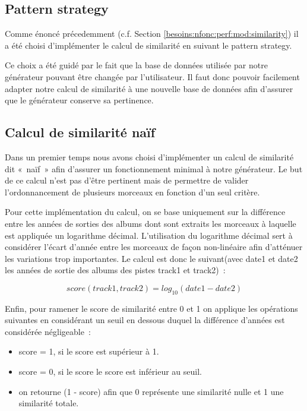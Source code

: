 \subsection{Pattern strategy}
\label{impl:similatite:strategy}

Comme énoncé précedemment (c.f. Section \ref{besoins:nfonc:perf:mod:similarity}) il a été choisi d'implémenter le calcul de similarité en suivant le pattern strategy.\newline

Ce choix a été guidé par le fait que la base de données utilisée par notre générateur pouvant être changée par l'utilisateur. Il faut donc pouvoir facilement adapter notre calcul de similarité à une nouvelle base de données afin d'assurer que le générateur conserve sa pertinence.

\subsection{Calcul de similarité naïf}
\label{impl:similarite:naif}

Dans un premier temps nous avons choisi d'implémenter un calcul de similarité dit «~naïf~» afin d'assurer un fonctionnement minimal à notre générateur. 
Le but de ce calcul n'est pas d'être pertinent mais de permettre de valider l'ordonnancement de plusieurs morceaux en fonction d'un seul critère.\newline

Pour cette implémentation du calcul, on se base uniquement sur la différence entre les années de sorties des albums dont sont extraits les morceaux à laquelle est appliquée un logarithme décimal. L'utilisation du logarithme décimal sert à considérer l'écart d'année entre les morceaux de façon non-linéaire afin d'atténuer les variations trop importantes. Le calcul est donc le suivant(avec date1 et date2 les années de sortie des albums des pistes track1 et track2)~:

\begin{equation*}
  score(track1, track2) = log_{10}(date1 - date2)
\end{equation*}\newline

Enfin, pour ramener le score de similarité entre 0 et 1 on applique les opérations suivantes en considérant un seuil en dessous duquel la différence d'années est considérée négligeable~:

\begin{itemize}
\item score = 1, si le score est supérieur à 1. 
\item score = 0, si le score le score est inférieur au seuil.
\item on retourne (1 - score) afin que 0 représente une similarité nulle et 1 une similarité totale.
\end{itemize}

